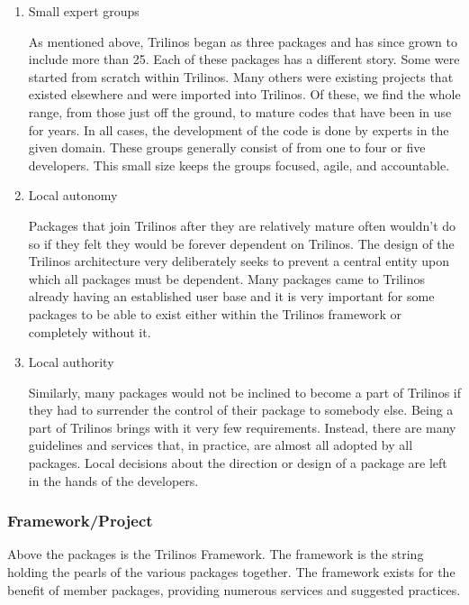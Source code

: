 \documentclass[12pt,relax]{article}
\begin{document}
  \begin{enumerate}
  \item  Small expert groups
  
  As mentioned above, Trilinos began as three packages and has since grown to 
  include more than 25.  Each of these packages has a different story.  Some
  were started from scratch within Trilinos.  Many others were existing
  projects that existed elsewhere and were imported into Trilinos.  Of these,
  we find the whole range, from those just off the ground, to mature codes
  that have been in use for years.  In all cases, the development of the 
  code is done by experts in the given domain.  These groups generally consist
  of from one to four or five developers.  This small size keeps the groups
  focused, agile, and accountable.
  
  \item Local autonomy
    
  Packages that join Trilinos after they are relatively mature often wouldn't
  do so if they felt they would be forever dependent on Trilinos.  The design
  of the Trilinos architecture very deliberately seeks to prevent a central
  entity upon which all packages must be dependent.  Many packages came to 
  Trilinos already having an established user base and it is very important
  for some packages to be able to exist either within the Trilinos framework
  or completely without it.
  
  \item Local authority
  
  Similarly, many packages would not be inclined to become a part of Trilinos
  if they had to surrender the control of their package to somebody else.
  Being a part of Trilinos brings with it very few requirements.  Instead,
  there are many guidelines and services that, in practice, are almost all
  adopted by all packages.  Local decisions about the direction or design of
  a package are left in the hands of the developers.

  \end{enumerate}

  \subsubsection{Framework/Project}
  
  Above the packages is the Trilinos Framework.  The framework is the string
  holding the pearls of the various packages together.  The framework exists
  for the benefit of member packages, providing numerous services and 
  suggested practices.
\end{document}
